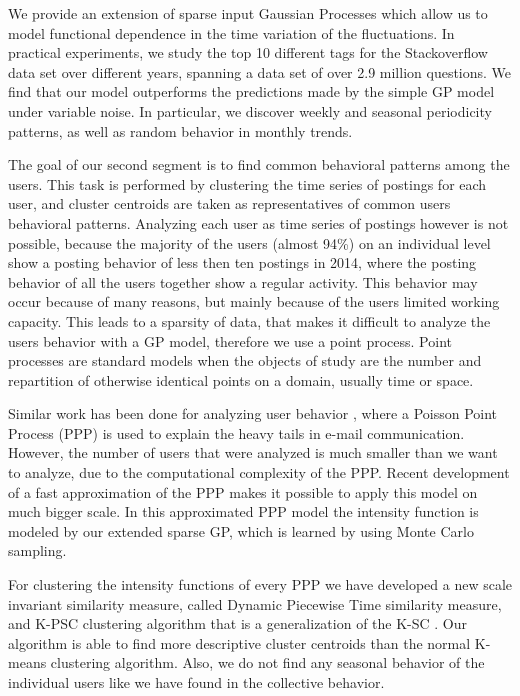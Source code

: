 \documentclass[../thesis.tex]{subfiles}
\begin{document}
We provide an extension of sparse input Gaussian Processes \cite{VariableSparse,Sparse} which allow 
us to model functional dependence in the time variation of the fluctuations. In practical 
experiments, we study the top 10 different tags for the Stackoverflow data set over different years, 
spanning a data set of over 2.9 million questions. We find that our model outperforms the predictions 
made by the simple GP model under variable noise. In particular, we discover weekly and seasonal 
periodicity patterns, as well as random behavior in monthly trends.

The goal of our second segment is to find common behavioral patterns among the users. This task is 
performed by clustering the time series of postings for each user, and cluster centroids are taken 
as representatives of common users behavioral patterns. Analyzing each user as time series 
of postings however is not possible, because the majority of the users (almost 94\%) on an 
individual level show a posting behavior of less then ten postings in 2014, where the posting 
behavior of all the users together show a regular activity. This behavior may occur because of many 
reasons, but mainly because of the users limited working capacity. This leads to a sparsity of data, 
that makes it difficult to analyze the users behavior with a GP model, therefore we use a point 
process. Point processes are standard models when the objects of study are the number and 
repartition of otherwise identical points on a domain, usually time or space.

Similar work has been done for analyzing user behavior \cite{malmgren2008poissonian}, where a 
Poisson Point Process (PPP) is used to explain the heavy tails in e-mail communication. However, 
the number of users that were analyzed is much smaller than we want to analyze, due to the 
computational complexity of the PPP. Recent development of a fast approximation 
\cite{samo2014scalable} of the PPP makes it possible to apply this model on much bigger scale. In 
this approximated PPP model the intensity function is modeled by our extended sparse GP, which is 
learned by using Monte Carlo sampling.

For clustering the intensity functions of every PPP we have developed a new scale invariant 
similarity measure, called Dynamic Piecewise Time similarity measure, and K-PSC clustering algorithm 
that is a generalization of the K-SC \cite{yang2011patterns}. Our algorithm is able to find more 
descriptive cluster centroids than the normal K-means clustering algorithm. Also, we do not find 
any seasonal behavior of the individual users like we have found in the collective behavior.
\end{document}

